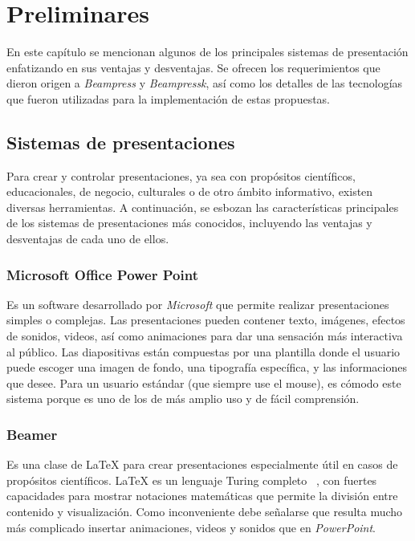 \chapter{Preliminares} %
\label{cha:preliminares}

	En este capítulo se mencionan algunos de los principales sistemas de presentación enfatizando en sus ventajas y desventajas. Se ofrecen los requerimientos que dieron origen a \textit{Beampress} y \textit{Beampressk}, así como los detalles de las tecnologías que fueron utilizadas para la implementación de estas propuestas.	

	\section{Sistemas de presentaciones} %
	\label{sec:sistemas_de_presentaciones}
		Para crear y controlar presentaciones, ya sea con propósitos científicos, educacionales, de negocio, culturales o de otro ámbito informativo, existen diversas herramientas. A continuación, se esbozan las características principales de los sistemas de presentaciones más conocidos, incluyendo las ventajas y desventajas de cada uno de ellos.	
		\subsection{Microsoft Office Power Point} %
		\label{sub:microsoft_office_power_point}

			Es un software desarrollado por \textit{Microsoft}  que permite realizar presentaciones simples o complejas. Las presentaciones pueden contener texto, imágenes, efectos de sonidos, videos, así como animaciones para dar una sensación más interactiva al público. Las diapositivas están compuestas por una plantilla donde el usuario puede escoger una imagen de fondo, una tipografía específica, y las informaciones que desee. Para un usuario estándar (que siempre use el mouse), es cómodo este sistema porque es uno de los de más amplio uso y de fácil comprensión. 


		\subsection{Beamer} %
		\label{sub:beamer}

			Es una clase de \LaTeX{} para crear presentaciones especialmente útil en casos de propósitos científicos. \LaTeX{} es un lenguaje Turing completo ~\cite{turing}, con fuertes capacidades para mostrar notaciones matemáticas que permite la división entre contenido y visualización. Como inconveniente debe señalarse que resulta mucho más complicado insertar animaciones, videos y sonidos que en \textit{PowerPoint}.

